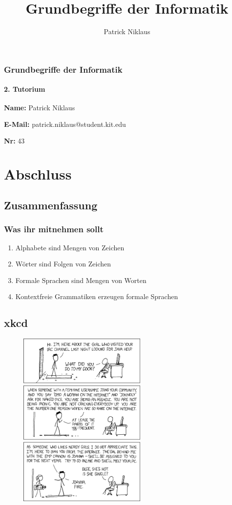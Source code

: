 \documentclass{beamer}
\title{Grundbegriffe der Informatik}
\author{Patrick Niklaus}
\begin{document}
\begin{frame}
  \frametitle{Grundbegriffe der Informatik}
  \framesubtitle{2. Tutorium}
  \begin{description}
    \item \textbf{Name:} Patrick Niklaus
    \item \textbf{E-Mail:} patrick.niklaus@student.kit.edu
    \item \textbf{Nr:} 43
  \end{description}
\end{frame}





\section{Abschluss}
\subsection{Zusammenfassung}
\begin{frame}
  \frametitle{Was ihr mitnehmen sollt}
  \begin{enumerate}
    \item Alphabete sind Mengen von Zeichen
    \item Wörter sind Folgen von Zeichen
    \item Formale Sprachen sind Mengen von Worten
    \item Kontextfreie Grammatiken erzeugen formale Sprachen
   \end{enumerate}
\end{frame}

\subsection{xkcd}
\begin{frame}[plain]
  \begin{figure}
    \begin{center}
      \includegraphics[height=250pt]{pix_plz}
    \end{center}
  \end{figure}
\end{frame}
\end{document}
